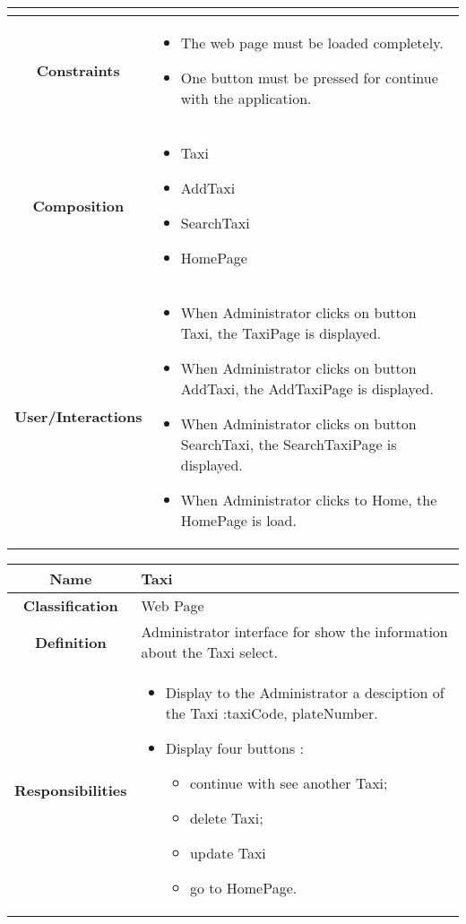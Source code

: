 \documentclass[11pt, a4paper,titlepage]{article}
\begin{document}
\begin{enumerate}
\begin{tabularx}{\textwidth}{| c | X |}
\begin{itemize}
	\end{itemize}
	\\
	\hline
	\textbf{Constraints} &
	\begin{itemize}
		\item  The web page must be loaded completely.
		\item One button must be pressed for continue with the application.
	\end{itemize}
	\\
	\hline
	\textbf{Composition} &
	\begin{itemize}
		\item Taxi
		\item AddTaxi
		\item SearchTaxi
		\item HomePage
	\end{itemize}
	\\
	\hline
	\textbf{User/Interactions} &
	\begin{itemize}
		\item When Administrator clicks on button Taxi, the TaxiPage is displayed.
		\item When Administrator clicks on button AddTaxi, the AddTaxiPage is displayed.
		\item When Administrator clicks on button SearchTaxi, the SearchTaxiPage is displayed.
		\item When Administrator clicks to Home, the HomePage is load.
	\end{itemize}
	\\
	\hline 
\end{tabularx}
\begin{tabularx}{\textwidth}{| c | X |}
	\hline
	\textbf{Name} &
	Taxi
	\\
	\hline
	\textbf{Classification} &
	Web Page
	\\
	\hline
	\textbf{Definition} &
	Administrator interface for show the information about the Taxi select.\\
	\hline
	\textbf{Responsibilities} &
	\begin{itemize}
		\item Display to the Administrator a desciption of the Taxi :taxiCode, plateNumber.
		\item Display four buttons :
		\begin{itemize}
			\item continue with see another Taxi;
			\item delete Taxi;
			\item update Taxi
			\item go to HomePage.

\end{itemize}
\end{itemize}
\end{tabularx}
\end{enumerate}
\end{document}
